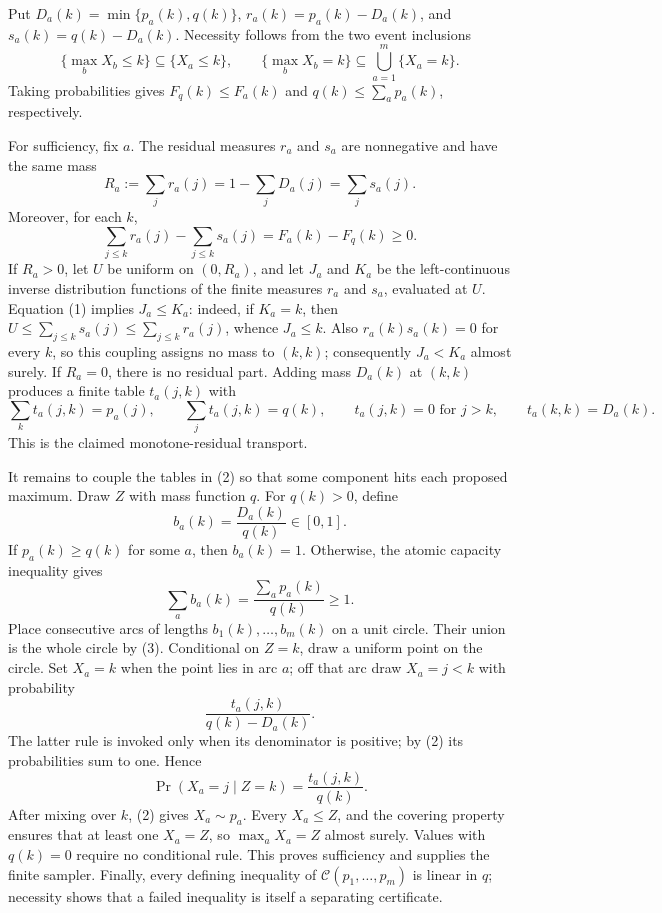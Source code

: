 Put \(D_a(k)=\min\{p_a(k),q(k)\}\), \(r_a(k)=p_a(k)-D_a(k)\), and \(s_a(k)=q(k)-D_a(k)\).  Necessity follows from the two event inclusions
\[
 \{\max_bX_b\leq k\}\subseteq\{X_a\leq k\},
 \qquad
 \{\max_bX_b=k\}\subseteq\bigcup_{a=1}^m\{X_a=k\}.
\]
Taking probabilities gives \(F_q(k)\leq F_a(k)\) and \(q(k)\leq\sum_a p_a(k)\), respectively.

For sufficiency, fix \(a\).  The residual measures \(r_a\) and \(s_a\) are nonnegative and have the same mass
\[
 R_a:=\sum_jr_a(j)=1-\sum_jD_a(j)=\sum_js_a(j).
\]
Moreover, for each \(k\),
\[
 \sum_{j\leq k}r_a(j)-\sum_{j\leq k}s_a(j)
 =F_a(k)-F_q(k)\geq0.                                      \tag{1}
\]
If \(R_a>0\), let \(U\) be uniform on \((0,R_a)\), and let \(J_a\) and \(K_a\) be the left-continuous inverse distribution functions of the finite measures \(r_a\) and \(s_a\), evaluated at \(U\).  Equation (1) implies \(J_a\leq K_a\): indeed, if \(K_a=k\), then \(U\leq\sum_{j\leq k}s_a(j)\leq\sum_{j\leq k}r_a(j)\), whence \(J_a\leq k\).  Also \(r_a(k)s_a(k)=0\) for every \(k\), so this coupling assigns no mass to \((k,k)\); consequently \(J_a<K_a\) almost surely.  If \(R_a=0\), there is no residual part.  Adding mass \(D_a(k)\) at \((k,k)\) produces a finite table \(t_a(j,k)\) with
\[
 \sum_kt_a(j,k)=p_a(j),\qquad
 \sum_jt_a(j,k)=q(k),\qquad
 t_a(j,k)=0\text{ for }j>k,
 \qquad t_a(k,k)=D_a(k).                                  \tag{2}
\]
This is the claimed monotone-residual transport.

It remains to couple the tables in (2) so that some component hits each proposed maximum.  Draw \(Z\) with mass function \(q\).  For \(q(k)>0\), define
\[
 b_a(k)=\frac{D_a(k)}{q(k)}\in[0,1].
\]
If \(p_a(k)\geq q(k)\) for some \(a\), then \(b_a(k)=1\).  Otherwise, the atomic capacity inequality gives
\[
 \sum_ab_a(k)=\frac{\sum_ap_a(k)}{q(k)}\geq1.              \tag{3}
\]
Place consecutive arcs of lengths \(b_1(k),\ldots,b_m(k)\) on a unit circle.  Their union is the whole circle by (3).  Conditional on \(Z=k\), draw a uniform point on the circle.  Set \(X_a=k\) when the point lies in arc \(a\); off that arc draw \(X_a=j<k\) with probability
\[
 \frac{t_a(j,k)}{q(k)-D_a(k)}.
\]
The latter rule is invoked only when its denominator is positive; by (2) its probabilities sum to one.  Hence
\[
 \Pr(X_a=j\mid Z=k)=\frac{t_a(j,k)}{q(k)}.
\]
After mixing over \(k\), (2) gives \(X_a\sim p_a\).  Every \(X_a\leq Z\), and the covering property ensures that at least one \(X_a=Z\), so \(\max_aX_a=Z\) almost surely.  Values with \(q(k)=0\) require no conditional rule.  This proves sufficiency and supplies the finite sampler.  Finally, every defining inequality of \(\mathcal C(p_1,\ldots,p_m)\) is linear in \(q\); necessity shows that a failed inequality is itself a separating certificate.


